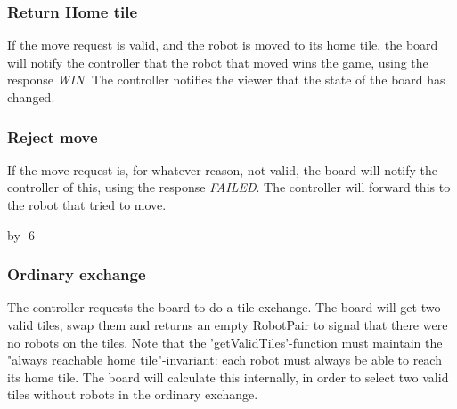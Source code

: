 	\subsubsection{Return Home tile}
	\begin{minipage}{\linewidth}
	   If the move request is valid, and the robot is moved to its home tile, the board will notify the controller that the robot that moved wins the game, using the response \emph{WIN}. The controller notifies the viewer that the state of the board has changed.

		
	\end{minipage}

	\subsubsection{Reject move}
	\begin{minipage}{\linewidth}
		If the move request is, for whatever reason, not valid, the board will notify the controller of this, using the response \emph{FAILED}. The controller will forward this to the robot that tried to move.

		
	\end{minipage}

	\advance{} by -6

	\subsubsection{Ordinary exchange}
	\begin{minipage}{\linewidth}
		The controller requests the board to do a tile exchange. The board will get two valid tiles, swap them and returns an empty RobotPair to signal that there were no robots on the tiles. Note that the 'getValidTiles'-function must maintain the "always reachable home tile"-invariant: each robot must always be able to reach its home tile. The board will calculate this internally, in order to select two valid tiles without robots in the ordinary exchange.

		
	\end{minipage}

